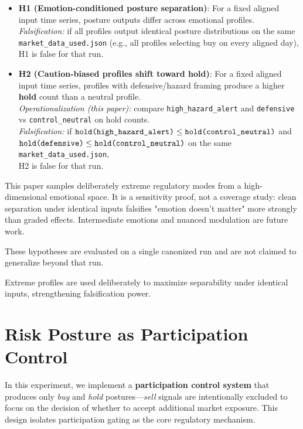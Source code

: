 \documentclass[12pt,a4paper]{article}
\begin{document}
\begin{itemize}
	\item \textbf{H1 (Emotion-conditioned posture separation)}: For a fixed aligned input time series, posture outputs differ across emotional profiles.
	\\
	\emph{Falsification:} if all profiles output identical posture distributions on the same \texttt{market\_data\_used.json} (e.g., all profiles selecting buy on every aligned day), H1 is false for that run.
    
	\item \textbf{H2 (Caution-biased profiles shift toward hold)}: For a fixed aligned input time series, profiles with defensive/hazard framing produce a higher \textbf{hold} count than a neutral profile.
	\\
	\emph{Operationalization (this paper):} compare \texttt{high\_hazard\_alert} and \texttt{defensive} vs \texttt{control\_neutral} on hold counts.
	\\
	\emph{Falsification:} if \(\texttt{hold(high\_hazard\_alert)} \le \\ \texttt{hold(control\_neutral)}\) and \(\texttt{hold(defensive)} \le \\ 
    \texttt{hold(control\_neutral)}\) on the same \texttt{market\_data\_used.json}, \\
    H2 is false for that run.
\end{itemize}

This paper samples deliberately extreme regulatory modes from a high-dimensional emotional space. It is a sensitivity proof, not a coverage study: clean separation under identical inputs falsifies "emotion doesn't matter" more strongly than graded effects. Intermediate emotions and nuanced modulation are future work.

These hypotheses are evaluated on a single canonized run and are not claimed to generalize beyond that run.

Extreme profiles are used deliberately to maximize separability under identical inputs, strengthening falsification power.

\section{Risk Posture as Participation Control}

In this experiment, we implement a \textbf{participation control system} that produces only \emph{buy} and \emph{hold} postures—\emph{sell} signals are intentionally excluded to focus on the decision of whether to accept additional market exposure. This design isolates participation gating as the core regulatory mechanism.
\end{document}
